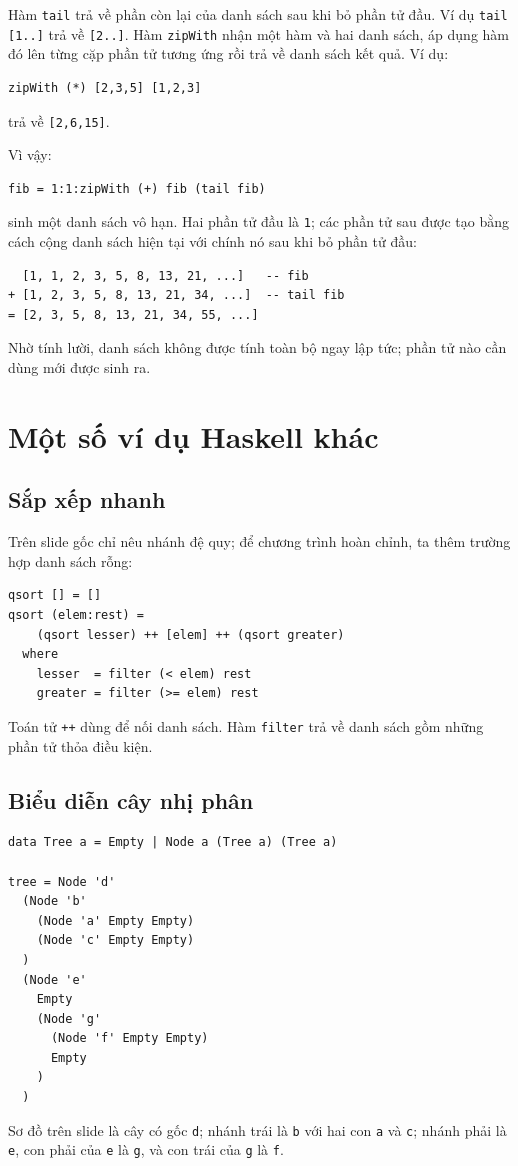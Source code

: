 \documentclass[11pt]{article}
\begin{document}
Hàm \texttt{tail} trả về phần còn lại của danh sách sau khi bỏ phần tử đầu.
Ví dụ \texttt{tail [1..]} trả về \texttt{[2..]}. Hàm \texttt{zipWith} nhận
một hàm và hai danh sách, áp dụng hàm đó lên từng cặp phần tử tương ứng rồi
trả về danh sách kết quả. Ví dụ:
\begin{verbatim}
zipWith (*) [2,3,5] [1,2,3]
\end{verbatim}
trả về \texttt{[2,6,15]}.

Vì vậy:
\begin{verbatim}
fib = 1:1:zipWith (+) fib (tail fib)
\end{verbatim}
sinh một danh sách vô hạn. Hai phần tử đầu là \texttt{1}; các phần tử sau
được tạo bằng cách cộng danh sách hiện tại với chính nó sau khi bỏ phần tử
đầu:
\begin{verbatim}
  [1, 1, 2, 3, 5, 8, 13, 21, ...]   -- fib
+ [1, 2, 3, 5, 8, 13, 21, 34, ...]  -- tail fib
= [2, 3, 5, 8, 13, 21, 34, 55, ...]
\end{verbatim}
Nhờ tính lười, danh sách không được tính toàn bộ ngay lập tức; phần tử nào
cần dùng mới được sinh ra.

\section{Một số ví dụ Haskell khác}

\subsection{Sắp xếp nhanh}

Trên slide gốc chỉ nêu nhánh đệ quy; để chương trình hoàn chỉnh, ta thêm
trường hợp danh sách rỗng:
\begin{verbatim}
qsort [] = []
qsort (elem:rest) =
    (qsort lesser) ++ [elem] ++ (qsort greater)
  where
    lesser  = filter (< elem) rest
    greater = filter (>= elem) rest
\end{verbatim}
Toán tử \texttt{++} dùng để nối danh sách. Hàm \texttt{filter} trả về danh
sách gồm những phần tử thỏa điều kiện.

\subsection{Biểu diễn cây nhị phân}

\begin{verbatim}
data Tree a = Empty | Node a (Tree a) (Tree a)

tree = Node 'd'
  (Node 'b'
    (Node 'a' Empty Empty)
    (Node 'c' Empty Empty)
  )
  (Node 'e'
    Empty
    (Node 'g'
      (Node 'f' Empty Empty)
      Empty
    )
  )
\end{verbatim}
Sơ đồ trên slide là cây có gốc \texttt{d}; nhánh trái là \texttt{b} với hai
con \texttt{a} và \texttt{c}; nhánh phải là \texttt{e}, con phải của
\texttt{e} là \texttt{g}, và con trái của \texttt{g} là \texttt{f}.
\end{document}
